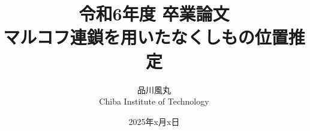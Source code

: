 \documentclass[a4paper,11pt]{jsbook}
\begin{document}
\title{令和6年度 卒業論文\\
マルコフ連鎖を用いたなくしもの位置推定}

\author{品川風丸 \\
Chiba Institute of Technology}

\date{2025年x月x日}

\maketitle

\clearpage




\tableofcontents



\cleardoublepage
{}






\appendix





\newpage
\printindex
\end{document}
